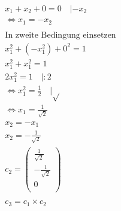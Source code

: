 \begin{align*}
    x_1 + x_2 + 0 = 0 \quad | - x_2                                                                                                                         \\
    \Leftrightarrow x_1 = -x_2                                                                                                                              \\\\
    \text{In zweite Bedingung einsetzen}                                                                                                                    \\
    x_1^2 + (- x_1^2) + 0^2 = 1                                                                                                                             \\
    x_1^2 + x_1^2 = 1                                                                                                                                       \\
    2x_1^2 = 1 \quad | : 2                                                                                                                                  \\
    \Leftrightarrow x_1^2 = \frac{1}{2} \quad | \sqrt{}                                                                                                     \\
    \Leftrightarrow x_1 = \frac{1}{\sqrt{2}}                                                                                                                \\
    x_2 = -x_1                                                                                                                                              \\
    x_2 = -\frac{1}{\sqrt{2}}                                                                                                                               \\
    c_2 = \begin{pmatrix}
              \frac{1}{\sqrt{2}}   \\
              - \frac{1}{\sqrt{2}} \\
              0                    \\
          \end{pmatrix}                                                                                                                \\\\
    c_3 = c_1 \times c_2                                                                                                                                    \\

\end{align*}
